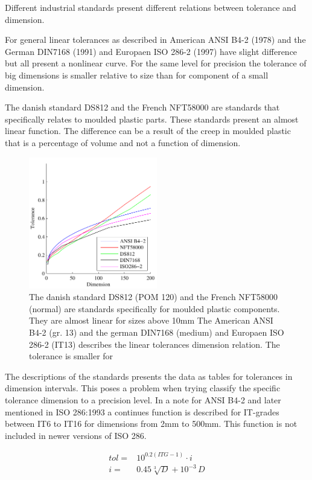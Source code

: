 \documentclass[aip,amsmath, reprint, author-year]{revtex4-1}
\begin{document}
Different industrial standards present different relations between tolerance and dimension. 

For general linear tolerances as described in American ANSI B4-2 (1978) and the German DIN7168 (1991) and Europaen ISO 286-2 (1997) have slight difference but all present a nonlinear curve. For the same level for precision the tolerance of big dimensions is smaller relative to size than for component of a small dimension.

The danish standard DS812 and the French NFT58000 are standards that specifically relates to moulded plastic parts. These standards present an almost linear function. The difference can be a result of the creep in moulded plastic that is a percentage of volume and not a function of dimension.


\begin{figure}
\includegraphics[width=0.5\textwidth]{Tolerance_standards.pdf}
\caption{\label{fig:tolstd} The danish standard DS812 (POM 120) and the French NFT58000 (normal) are standards specifically for moulded plastic components. They are almost linear for sizes above 10mm The American ANSI B4-2 (gr. 13) and the german DIN7168 (medium) and Europaen ISO 286-2 (IT13) describes the linear tolerances dimension relation. The tolerance is smaller for }
\end{figure}

The descriptions of the standards presents the data as tables for tolerances in dimension intervals. This poses a problem when trying classify the specific tolerance dimension to a precision level.
In a note for ANSI B4-2  and later mentioned in ISO 286:1993 a continues function is described for IT-grades between IT6 to IT16 for dimensions from 2mm to 500mm. This function is not included in newer versions of ISO 286.

\begin{align}
	tol =& 10^{0.2 (ITG -1)} \cdot i \\
	i =& 0.45 \sqrt[3]{D} + 10^{-3} \, D 
\end{align}
\end{document}

